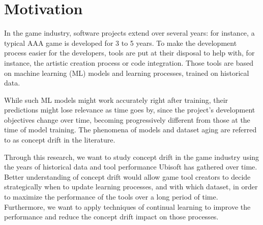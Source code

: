 \section{Motivation}


In the game industry, software projects extend over several years: for instance, a typical AAA game is developed for 3 to 5 years. To make the development process easier for the developers, tools are put at their disposal to help with, for instance, the artistic creation process or code integration. Those tools are based on machine learning (ML) models and learning processes, trained on historical data.

While such ML models might work accurately right after training, their predictions might lose relevance as time goes by, since the project's development objectives change over time, becoming progressively different from those at the time of model training. The phenomena of models and dataset aging are referred to as concept drift in the literature.

Through this research, we want to study concept drift in the game industry using the years of historical data and tool performance Ubisoft has gathered over time. Better understanding of concept drift would allow game tool creators to decide strategically when to update learning processes, and with which dataset, in order to maximize the performance of the tools over a long period of time. Furthermore, we want to apply techniques of continual learning to improve the performance and reduce the concept drift impact on those processes.
